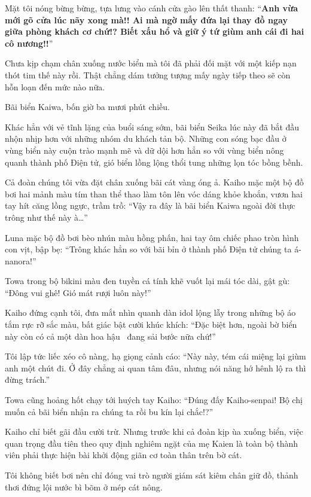 \documentclass[../main.tex]{subfiles}
\begin{document}
Mặt tôi nóng bừng bừng, tựa lưng vào cánh cửa gào lên thất thanh: ``\textbf{Anh vừa mới gõ cửa lúc nãy xong mà!! Ai mà ngờ mấy đứa lại thay đồ ngay giữa phòng khách cơ chứ!? Biết xấu hổ và giữ ý tứ giùm anh cái đi hai cô nương!!}''

Chưa kịp chạm chân xuống nước biển mà tôi đã phải đối mặt với một kiếp nạn thót tim thế này rồi. Thật chẳng dám tưởng tượng mấy ngày tiếp theo sẽ còn hỗn loạn đến mức nào nữa.

\ct

Bãi biển Kaiwa, bốn giờ ba mươi phút chiều.

Khác hẳn với vẻ tĩnh lặng của buổi sáng sớm, bãi biển Seika lúc này đã bắt đầu nhộn nhịp hơn với những nhóm du khách tản bộ. Những con sóng bạc đầu ở vùng biển này cuộn trào mạnh mẽ và dữ dội hơn hẳn so với vùng biển nông quanh thành phố Điện tử, gió biển lồng lộng thổi tung những lọn tóc bồng bềnh.

Cả đoàn chúng tôi vừa đặt chân xuống bãi cát vàng óng ả. Kaiho mặc một bộ đồ bơi hai mảnh màu tím than thể thao làm tôn lên vóc dáng khỏe khoắn, vươn hai tay hít căng lồng ngực, trầm trồ: ``Vậy ra đây là bãi biển Kaiwa ngoài đời thực trông như thế này à\dots''

Luna mặc bộ đồ bơi bèo nhún màu hồng phấn, hai tay ôm chiếc phao tròn hình con vịt, bập bẹ: ``Trông khác hẳn so với bãi bỉn ở thành phố Điện tử chúng ta á-nanora!''

Towa trong bộ bikini màu đen tuyền cá tính khẽ vuốt lại mái tóc dài, gật gù: ``Đông vui ghê! Gió mát rượi luôn này!''

Kaiho đứng cạnh tôi, đưa mắt nhìn quanh dàn idol lộng lẫy trong những bộ áo tắm rực rỡ sắc màu, bất giác bật cười khúc khích: ``Đặc biệt hơn, ngoài bờ biển này còn có cả một dàn hoa hậu \hll\ đang sải bước nữa chứ!''

Tôi lập tức liếc xéo cô nàng, hạ giọng cảnh cáo: ``Này này, tém cái miệng lại giùm anh một chút đi. Ở đây chẳng ai quan tâm đâu, nhưng nói năng hớ hênh lộ ra thì đừng trách.''

Towa cũng hoảng hốt chạy tới huých tay Kaiho: ``Đúng đấy Kaiho-senpai! Bộ chị muốn cả bãi biển nhận ra chúng ta rồi bu kín lại chắc!?''

Kaiho chỉ biết gãi đầu cười trừ. Nhưng trước khi cả đoàn kịp ùa xuống biển, việc quan trọng đầu tiên theo quy định nghiêm ngặt của mẹ Kaien là toàn bộ thành viên phải thực hiện bài khởi động giãn cơ toàn thân trên bờ cát.

Tôi không biết bơi nên chỉ đóng vai trò người giám sát kiêm chân giữ đồ, thảnh thơi đứng lội nước bì bõm ở mép cát nông.
\end{document}
